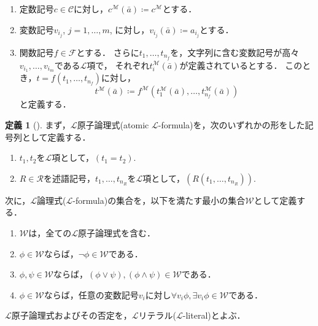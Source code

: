 \documentclass[uplatex, dvipdfmx]{jsarticle}
\numberwithin{equation}{section}
\theoremstyle{definition}
\newtheorem{definition}{定義}[section]
\begin{document}
\begin{enumerate}
     \item 定数記号$c \in \mathcal{C}$に対し，$c^\mathcal{M}(\bar{a}) \coloneqq c^\mathcal{M}$とする．
     \item 変数記号$v_{i_j}$, $j=1, \dots, m$, に対し，$v_{i_j}(\bar{a}) \coloneqq a_{i_j}$とする．
     \item 
     関数記号$f \in \mathcal{F}$とする．
     さらに$t_1, \dots, t_{n_f}$を，文字列に含む変数記号が高々$v_{i_1}, \dots, v_{i_m}$である$\mathcal{L}$項で，
     それぞれ$t_i^\mathcal{M}(\bar{a})$が定義されているとする．
     このとき，$t = f(t_1, \dots, t_{n_f})$に対し，
     \begin{equation}
          t^\mathcal{M}(\bar{a})\coloneqq f^\mathcal{M}(t_1^\mathcal{M}(\bar{a}), \dots, t_{n_f}^\mathcal{M}(\bar{a}))
     \end{equation}
     と定義する．
\end{enumerate}

\begin{definition}[{\cite[Definition 1.1.5]{MR1924282}}]
     まず，$\mathcal{L}$原子論理式(atomic $\mathcal{L}$-formula)を，次のいずれかの形をした記号列として定義する．
     \begin{enumerate}
          \item $t_1, t_2$を$\mathcal{L}$項として，$(t_1 = t_2)$.
          \item $R \in \mathcal{R}$を述語記号，$t_1, \dots, t_{n_R}$を$\mathcal{L}$項として，$(R(t_1, \dots, t_{n_R}))$.
     \end{enumerate}
     次に，$\mathcal{L}$論理式($\mathcal{L}$-formula)の集合を，以下を満たす最小の集合$\mathcal{W}$として定義する．
     \begin{enumerate}
          \item $\mathcal{W}$は，全ての$\mathcal{L}原子論理式$を含む．
          \item $\phi \in \mathcal{W}$ならば，$\lnot \phi \in \mathcal{W}$である．
          \item $\phi, \psi \in \mathcal{W}$ならば，$(\phi \lor \psi), (\phi \land \psi) \in \mathcal{W}$である．
          \item $\phi \in \mathcal{W}$ならば，任意の変数記号$v_i$に対し$\forall v_i \phi, \exists v_i \phi \in \mathcal{W}$である．
     \end{enumerate}
\end{definition}

$\mathcal{L}$原子論理式およびその否定を，$\mathcal{L}$リテラル($\mathcal{L}$-literal)とよぶ．
\end{document}
